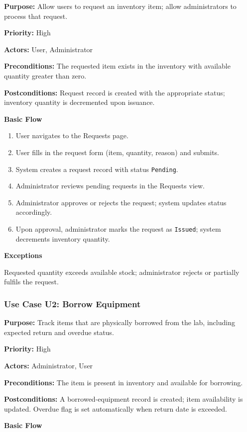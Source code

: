 \documentclass[12pt]{article}
\begin{document}
\textbf{Purpose:} Allow users to request an inventory item; allow administrators to process that request.

\textbf{Priority:} High

\textbf{Actors:} User, Administrator

\textbf{Preconditions:} The requested item exists in the inventory with available quantity greater than zero.

\textbf{Postconditions:} Request record is created with the appropriate status; inventory quantity is decremented upon issuance.

\textbf{Basic Flow}

\begin{enumerate}
\item User navigates to the Requests page.
\item User fills in the request form (item, quantity, reason) and submits.
\item System creates a request record with status \texttt{Pending}.
\item Administrator reviews pending requests in the Requests view.
\item Administrator approves or rejects the request; system updates status accordingly.
\item Upon approval, administrator marks the request as \texttt{Issued}; system decrements inventory quantity.
\end{enumerate}

\textbf{Exceptions}

Requested quantity exceeds available stock; administrator rejects or partially fulfils the request.

\subsubsection{Use Case U2: Borrow Equipment}

\textbf{Purpose:} Track items that are physically borrowed from the lab, including expected return and overdue status.

\textbf{Priority:} High

\textbf{Actors:} Administrator, User

\textbf{Preconditions:} The item is present in inventory and available for borrowing.

\textbf{Postconditions:} A borrowed-equipment record is created; item availability is updated. Overdue flag is set automatically when return date is exceeded.

\textbf{Basic Flow}
\end{document}
